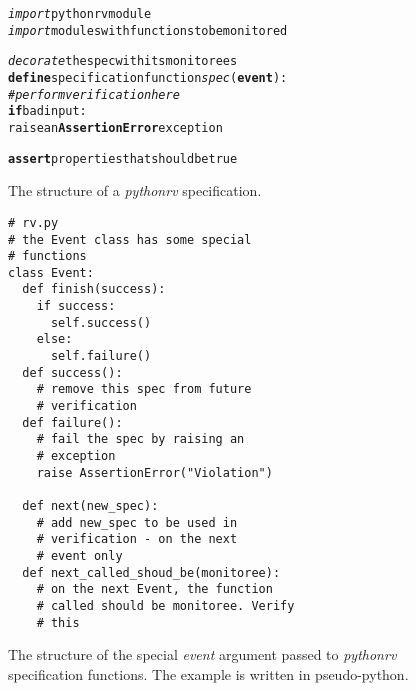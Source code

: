\documentclass[a4paper,11pt]{kth-mag}
\theoremstyle{definition}
\begin{document}
\begin{figure}[h!]
	\begin{center}
	\begin{minipage}{0.7\textwidth}
    \begin{alltt}
\emph{import} pythonrv module
\emph{import} modules with functions to be monitored

\emph{decorate} the spec with its monitorees
\textbf{define} specification function \textit{spec}(\textbf{event}):
  \textit{# perform verification here}
  \textbf{if} bad input:
    raise an \textbf{AssertionError} exception

  \textbf{assert} properties that should be true
    \end{alltt}
	\end{minipage}
	\end{center}

  \caption{The structure of a \textit{pythonrv} specification.}
	\label{figure-pseudo-spec}
\end{figure}

\begin{figure}[h!]
	\begin{center}
	\begin{minipage}{0.7\textwidth}
	\begin{lstlisting}
# rv.py
# the Event class has some special
# functions
class Event:
  def finish(success):
    if success:
      self.success()
    else:
      self.failure()
  def success():
    # remove this spec from future
    # verification
  def failure():
    # fail the spec by raising an
    # exception
    raise AssertionError("Violation")

  def next(new_spec):
    # add new_spec to be used in
    # verification - on the next
    # event only
  def next_called_shoud_be(monitoree):
    # on the next Event, the function
    # called should be monitoree. Verify
    # this
	\end{lstlisting}
	\end{minipage}
	\end{center}

  \caption{The structure of the special \textit{event} argument passed to
    \textit{pythonrv} specification functions. The example is written in
    pseudo-python.}
	\label{figure-event-functions}
\end{figure}
\end{document}

